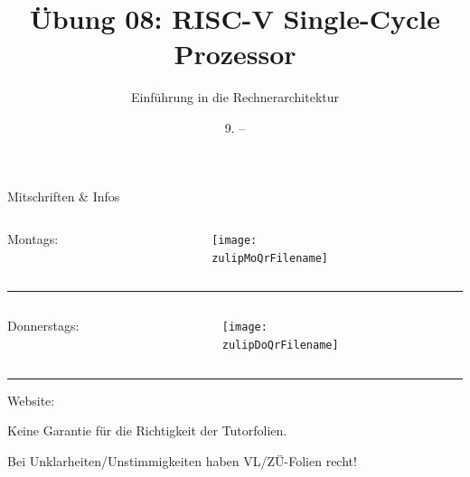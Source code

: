 \documentclass[
  german,            %
  aspectratio=169,    %
]{tumbeamer}
\title{Übung 08: RISC-V Single-Cycle Prozessor}
\subtitle{Einführung in die Rechnerarchitektur}
\author{\theAuthorName}
\institute{\theGroupName\\\theSchoolName\\\theUniversityName}
\date{9. -- \DTMdisplaydate{2024}{12}{15}{-1}}
\begin{document}
\maketitle

\begin{frame}[c]{Mitschriften \& Infos}{}
  \begin{minipage}[t]{\textwidth}
    \begin{columns}[c]
      \begin{column}{0.8\textwidth}
        Montags: \href{\zulipMo}{\zulipMo}
      \end{column}
      \begin{column}{0.2\textwidth}
        \texttt{[image: \\zulipMoQrFilename]}
      \end{column}
    \end{columns}
  \end{minipage}
  \rule{\textwidth}{0.4pt}
  \begin{minipage}[t]{\textwidth}
    \begin{columns}[c]
      \begin{column}{0.8\textwidth}
        Donnerstags: \href{\zulipDo}{\zulipDo}
      \end{column}
      \begin{column}{0.2\textwidth}
        \texttt{[image: \\zulipDoQrFilename]}
      \end{column}
    \end{columns}
  \end{minipage}
  \ifdefined\myWebsite
  \rule{\textwidth}{0.4pt}
  \centering
  Website: \href{\myWebsite}{\myWebsite}
  \fi
\end{frame}

\begin{frame}[c]{}{}
  \begin{center}
    \LARGE  Keine Garantie für die Richtigkeit der Tutorfolien.

    \Large Bei Unklarheiten/Unstimmigkeiten haben VL/ZÜ-Folien recht!
  \end{center}
\end{frame}
\end{document}
